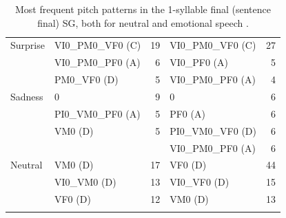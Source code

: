 \documentclass[output=paper]{langsci/langscibook}
\begin{document}
\begin{table}[p]
\begin{tabular}{llrlr}
\midrule
Surprise & VI0\_PM0\_VF0 (C) & 19              & VI0\_PM0\_VF0 (C)      & 27              \\
         & VI0\_PM0\_PF0 (A) & 6               & VI0\_PF0 (A)           & 5               \\
         & PM0\_VF0 (D)      & 5               & VI0\_PM0\_PF0 (A)      & 4               \\
\midrule
Sadness  & 0                 & 9               & 0                      & 6               \\
         & PI0\_VM0\_PF0 (A) & 5               & PF0 (A)                & 6               \\
         & VM0 (D)           & 5               & PI0\_VM0\_VF0 (D)      & 6               \\
         &                   &                 & VI0\_PM0\_PF0 (A)      & 6               \\
\midrule
Neutral  & VM0 (D)           & 17              & VF0 (D)                & 44              \\
         & VI0\_VM0 (D)      & 13              & VI0\_VF0 (D)           & 15              \\
         & VF0 (D)           & 12              & VM0 (D)                & 13             \\
         \lspbottomrule
\end{tabular}
\caption{Most frequent pitch patterns in the 1-syllable final (sentence final) SG, both for neutral and emotional speech \citep{Garrido2011}.}
\label{tab:gar:11}
\end{table}
\end{document}
